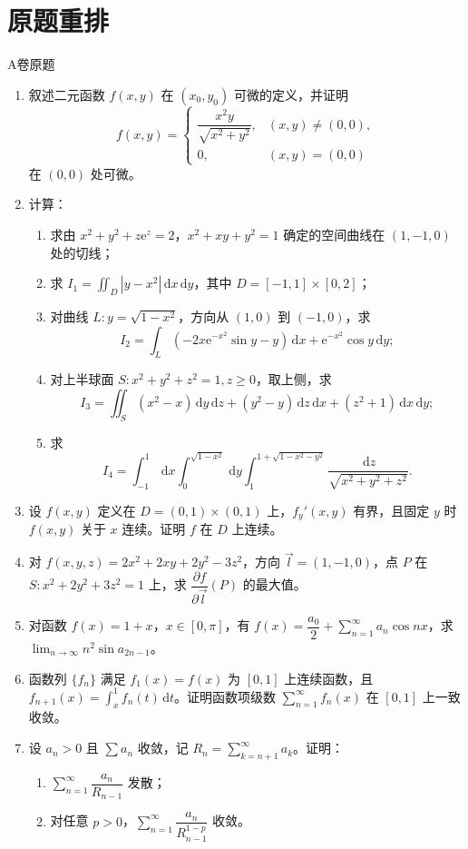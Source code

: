 \documentclass[UTF8,zihao=-4,openany]{ctexbook}
\newcommand{\dd}{\,\mathrm{d}}
\newcommand{\ee}{\mathrm{e}}
\begin{document}
\section*{原题重排}
\begin{problem}{A卷原题}
\begin{enumerate}[label=\textbf{A\arabic*.}]
\item 叙述二元函数 $f(x,y)$ 在 $(x_0,y_0)$ 可微的定义，并证明
\[
f(x,y)=\begin{cases}\dfrac{x^2y}{\sqrt{x^2+y^2}},&(x,y)\ne(0,0),\\0,&(x,y)=(0,0)
\end{cases}
\]
在 $(0,0)$ 处可微。
\item 计算：
\begin{enumerate}[label=(\arabic*)]
\item 求由 $x^2+y^2+z\ee^z=2$，$x^2+xy+y^2=1$ 确定的空间曲线在 $(1,-1,0)$ 处的切线；
\item 求 $I_1=\iint_D |y-x^2|\dd x\dd y$，其中 $D=[-1,1]\times[0,2]$；
\item 对曲线 $L:y=\sqrt{1-x^2}$，方向从 $(1,0)$ 到 $(-1,0)$，求
\[
I_2=\int_L(-2x\ee^{-x^2}\sin y-y)\dd x+\ee^{-x^2}\cos y\dd y;
\]
\item 对上半球面 $S:x^2+y^2+z^2=1,z\ge0$，取上侧，求
\[
I_3=\iint_S(x^2-x)\dd y\dd z+(y^2-y)\dd z\dd x+(z^2+1)\dd x\dd y;
\]
\item 求
\[
I_4=\int_{-1}^{1}\dd x\int_0^{\sqrt{1-x^2}}\dd y\int_1^{1+\sqrt{1-x^2-y^2}}\frac{\dd z}{\sqrt{x^2+y^2+z^2}}.
\]
\end{enumerate}
\item 设 $f(x,y)$ 定义在 $D=(0,1)\times(0,1)$ 上，$f_y'(x,y)$ 有界，且固定 $y$ 时 $f(x,y)$ 关于 $x$ 连续。证明 $f$ 在 $D$ 上连续。
\item 对 $f(x,y,z)=2x^2+2xy+2y^2-3z^2$，方向 $\vec l=(1,-1,0)$，点 $P$ 在 $S:x^2+2y^2+3z^2=1$ 上，求 $\dfrac{\partial f}{\partial \vec l}(P)$ 的最大值。
\item 对函数 $f(x)=1+x$，$x\in[0,\pi]$，有 $f(x)=\dfrac{a_0}{2}+\sum_{n=1}^{\infty}a_n\cos nx$，求 $\lim_{n\to\infty}n^2\sin a_{2n-1}$。
\item 函数列 $\{f_n\}$ 满足 $f_1(x)=f(x)$ 为 $[0,1]$ 上连续函数，且 $f_{n+1}(x)=\int_x^1 f_n(t)\dd t$。证明函数项级数 $\sum_{n=1}^{\infty}f_n(x)$ 在 $[0,1]$ 上一致收敛。
\item 设 $a_n>0$ 且 $\sum a_n$ 收敛，记 $R_n=\sum_{k=n+1}^{\infty}a_k$。证明：
\begin{enumerate}[label=(\arabic*)]
\item $\sum_{n=1}^{\infty}\dfrac{a_n}{R_{n-1}}$ 发散；
\item 对任意 $p>0$，$\sum_{n=1}^{\infty}\dfrac{a_n}{R_{n-1}^{1-p}}$ 收敛。
\end{enumerate}
\end{enumerate}
\end{problem}
\end{document}
